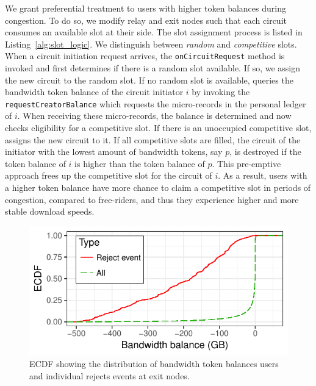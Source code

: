 We grant preferential treatment to users with higher token balances during congestion.
To do so, we modify relay and exit nodes such that each circuit consumes an available slot at their side.
The slot assignment process is listed in Listing~\ref{alg:slot_logic}.
We distinguish between \emph{random} and \emph{competitive} slots.
When a circuit initiation request arrives, the \texttt{onCircuitRequest} method is invoked and \Tribler{} first determines if there is a random slot available.
If so, we assign the new circuit to the random slot.
If no random slot is available, \Tribler{} queries the bandwidth token balance of the circuit initiator $ i $ by invoking the \texttt{requestCreatorBalance} which requests the micro-records in the personal ledger of $ i $.
When receiving these micro-records, the balance is determined and \Tribler{} now checks eligibility for a competitive slot.
If there is an unoccupied competitive slot, \Tribler{} assigns the new circuit to it.
If all competitive slots are filled, the circuit of the initiator with the lowest amount of bandwidth tokens, say $ p $, is destroyed if the token balance of $ i $ is higher than the token balance of $ p $.
This pre-emptive approach frees up the competitive slot for the circuit of $ i $.
As a result, users with a higher token balance have more chance to claim a competitive slot in periods of congestion, compared to free-riders, and thus they experience higher and more stable download speeds.

\begin{figure}[b]
	\centering
	\includegraphics[width=\linewidth]{trustchain/assets/exit_node_rejects}
	\caption{ECDF showing the distribution of bandwidth token balances users and individual rejects events at exit nodes.}
	\label{fig:exit_node_rejects}
\end{figure}


